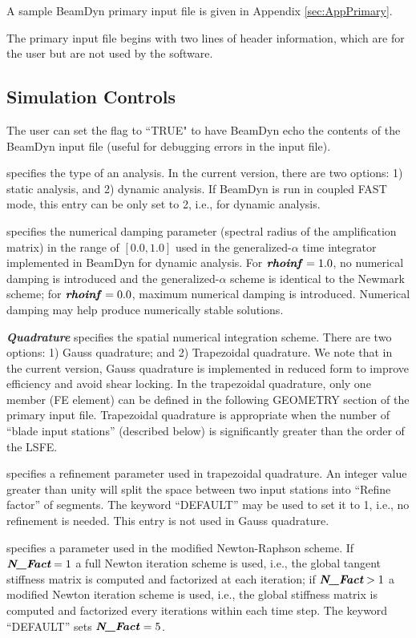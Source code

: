 A sample BeamDyn primary input file is given in Appendix \ref{sec:AppPrimary}.

The primary input file begins with two lines of header information, which are for the user but are not used by the software.

\subsection{Simulation Controls}

The user can set the  flag to ``TRUE" to have BeamDyn echo the contents of the BeamDyn input file (useful for debugging errors in the input file). 

 specifies the type of an analysis. 
In the current version, there are two options: 1) static analysis, and 2) dynamic analysis. 
If BeamDyn is run in coupled FAST mode, this entry can be only set to 2, i.e., for dynamic analysis.

 specifies the numerical damping parameter (spectral radius of the amplification matrix) in the range of $[0.0,1.0]$ used in the generalized-$\alpha$ time integrator implemented in BeamDyn for dynamic analysis. 
For $\textbf{\textit{rhoinf}}  = 1.0$, no numerical damping is introduced and the generalized-$\alpha$ scheme is identical to the Newmark scheme; for $\textbf{\textit{rhoinf}}  = 0.0$, maximum numerical damping is introduced. 
Numerical damping may help produce numerically stable solutions.

\textbf{\textit{Quadrature}} specifies the spatial numerical integration scheme. 
There are two options: 1) Gauss quadrature; and 2) Trapezoidal quadrature. 
We note that in the current version, Gauss quadrature is implemented in reduced form to improve efficiency and avoid shear locking. 
In the trapezoidal quadrature, only one member (FE element) can be defined in the following GEOMETRY section of the primary input file.  
Trapezoidal quadrature is appropriate when the number of ``blade input stations'' (described below) is significantly greater than the order of the LSFE.

 specifies a refinement parameter used in trapezoidal quadrature. 
An integer value greater than unity will split the space between two input stations into ``Refine factor'' of segments.
The keyword ``DEFAULT'' may be used to set it to 1, i.e., no refinement is needed. 
This entry is not used in Gauss quadrature.   

 specifies a parameter used in the modified Newton-Raphson scheme. 
If $\textit{\textbf{N\_Fact}} = 1$ a full Newton iteration scheme is used, i.e., the global tangent stiffness matrix is computed and factorized at each iteration; if $\textit{\textbf{N\_Fact}} >  1$ a modified Newton iteration scheme is used, i.e., 
the global stiffness matrix is computed and factorized every  iterations within each time step. 
The keyword ``DEFAULT'' sets $\textbf{\textit{N\_Fact}} = 5$.

